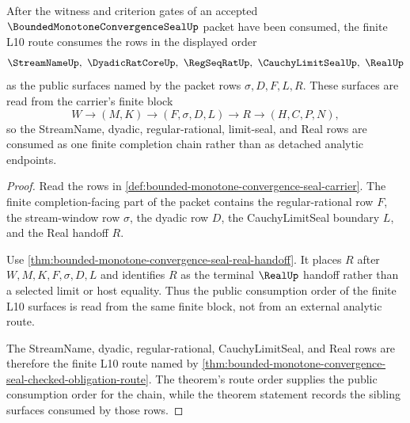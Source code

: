 \begin{theorem}
\label{thm:bounded-monotone-convergence-seal-stream-real-scope}
After the witness and criterion gates of an accepted $\BoundedMonotoneConvergenceSealUp$ packet have been consumed, the finite L10 route consumes the rows in the displayed order
$$
\StreamNameUp,\ \DyadicRatCoreUp,\ \RegSeqRatUp,\ \CauchyLimitSealUp,\ \RealUp
$$
as the public surfaces named by the packet rows $\sigma,D,F,L,R$. These surfaces are read from the carrier's finite block
$$
W \to (M,K) \to (F,\sigma,D,L) \to R \to (H,C,P,N),
$$
so the StreamName, dyadic, regular-rational, limit-seal, and Real rows are consumed as one finite completion chain rather than as detached analytic endpoints.
\end{theorem}
\begin{proof}
Read the rows in \autoref{def:bounded-monotone-convergence-seal-carrier}. The finite completion-facing part of the packet contains the regular-rational row $F$, the stream-window row $\sigma$, the dyadic row $D$, the CauchyLimitSeal boundary $L$, and the Real handoff $R$.

Use \autoref{thm:bounded-monotone-convergence-seal-real-handoff}. It places $R$ after $W,M,K,F,\sigma,D,L$ and identifies $R$ as the terminal $\RealUp$ handoff rather than a selected limit or host equality. Thus the public consumption order of the finite L10 surfaces is read from the same finite block, not from an external analytic route.

The StreamName, dyadic, regular-rational, CauchyLimitSeal, and Real rows are therefore the finite L10 route named by \autoref{thm:bounded-monotone-convergence-seal-checked-obligation-route}. The theorem's route order supplies the public consumption order for the chain, while the theorem statement records the sibling surfaces consumed by those rows.
\end{proof}

